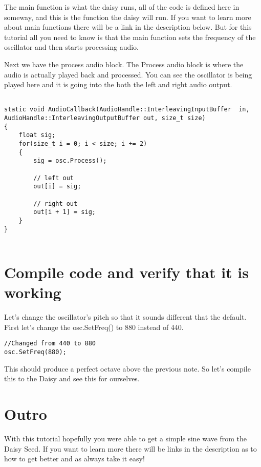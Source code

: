 \documentclass[12pt]{article}
\begin{document}
The main function is what the daisy runs, all of the code is defined here in someway, and this is the function the daisy will run. If you want to learn more about main functions there will be a link in the description below. But for this tutorial all you need to know is that the main function sets the frequency of the oscillator and then starts processing audio.

Next we have the process audio block. The Process audio block is where the audio is actually played back and processed. You can see the oscillator is being played here and it is going into the both the left and right audio output.

\begin{lstlisting}

static void AudioCallback(AudioHandle::InterleavingInputBuffer  in, AudioHandle::InterleavingOutputBuffer out, size_t size)
{
    float sig;
    for(size_t i = 0; i < size; i += 2)
    {
        sig = osc.Process();

        // left out
        out[i] = sig;

        // right out
        out[i + 1] = sig;
    }
}
 
\end{lstlisting}

\section{Compile code and verify that it is working}
Let's change the oscillator's pitch so that it sounds different that the default. First let's change the osc.SetFreq() to 880 instead of 440. 

\begin{lstlisting}
//Changed from 440 to 880
osc.SetFreq(880);
\end{lstlisting}

This should produce a perfect octave above the previous note. So let's compile this to the Daisy and see this for ourselves. 


\section{Outro}

With this tutorial hopefully you were able to get a simple sine wave from the Daisy Seed. If you want to learn more there will be links in the description as to how to get better and as always take it easy!
\end{document}

